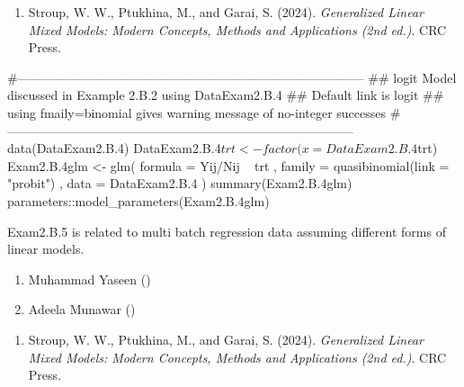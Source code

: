 \documentclass[a4paper]{book}
\begin{document}
%
\begin{References}
\begin{enumerate}

\item{} Stroup, W. W., Ptukhina, M., and Garai, S. (2024).
\emph{Generalized Linear Mixed Models: Modern Concepts, Methods and Applications (2nd ed.)}.
CRC Press.

\end{enumerate}

\end{References}
%
\begin{SeeAlso}
\end{SeeAlso}
%
\begin{Examples}
\begin{ExampleCode}
#-----------------------------------------------------------------------------------
## logit Model  discussed in Example 2.B.2 using DataExam2.B.4
## Default link is logit
## using fmaily=binomial gives warning message of no-integer successes
#-----------------------------------------------------------------------------------
data(DataExam2.B.4)
DataExam2.B.4$trt <- factor(x =  DataExam2.B.4$trt)
Exam2.B.4glm <-
                glm(
                      formula = Yij/Nij ~ trt
                    , family  =  quasibinomial(link = "probit")
                    , data    = DataExam2.B.4
                    )
summary(Exam2.B.4glm)
parameters::model_parameters(Exam2.B.4glm)
\end{ExampleCode}
\end{Examples}
%
\begin{Description}
Exam2.B.5 is related to multi batch regression data assuming different forms of linear models.
\end{Description}
%
\begin{Author}
\begin{enumerate}

\item{}  Muhammad Yaseen ()
\item{} Adeela Munawar ()

\end{enumerate}

\end{Author}
%
\begin{References}
\begin{enumerate}

\item{} Stroup, W. W., Ptukhina, M., and Garai, S. (2024).
\emph{Generalized Linear Mixed Models: Modern Concepts, Methods and Applications (2nd ed.)}.
CRC Press.

\end{enumerate}

\end{References}
\end{document}
